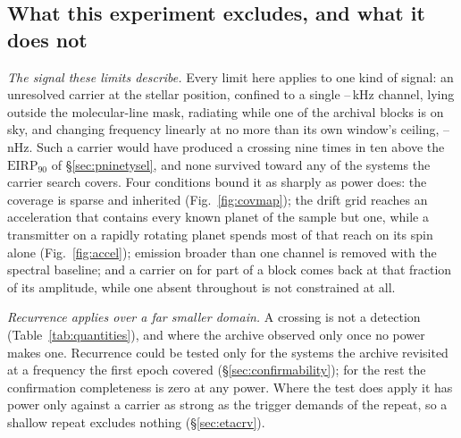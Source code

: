 \subsection{What this experiment excludes, and what it does not}
\label{sec:excludes}

\noindent\emph{The signal these limits describe.} Every limit here applies to
one kind of signal: an unresolved carrier at the stellar position, confined to
a single \ChanLoA--\ChanHiA\,kHz channel, lying outside the molecular-line
mask, radiating while one of the archival blocks is on sky, and changing
frequency linearly at no more than its own window's ceiling,
\DriftCeilLo--\DriftCeilHi\,nHz. Such a carrier would
have produced a crossing nine times in ten above the $\mathrm{EIRP}_{90}$ of
\S\ref{sec:pninetysel}, and none survived toward any of the \NSysClassA{}
systems the carrier search covers. Four conditions
bound it as sharply as power does: the coverage is sparse and
inherited (Fig.~\ref{fig:covmap}); the drift grid reaches an acceleration that contains every
known planet of the sample but one, while a transmitter on a rapidly rotating
planet spends most of that reach on its spin alone (Fig.~\ref{fig:accel}); emission broader than one channel is
removed with the spectral baseline; and a carrier on for part of a block comes
back at that fraction of its amplitude, while one absent throughout is not
constrained at all.

\noindent\emph{Recurrence applies over a far smaller domain.} A
crossing is not a detection (Table~\ref{tab:quantities}), and where the archive
observed only once no power makes one. Recurrence could be tested only for the
systems the archive revisited at a frequency the first epoch covered
(\S\ref{sec:confirmability}); for the rest the confirmation completeness is
zero at any power. Where the test does apply it has power
only against a carrier as strong as the trigger demands of the repeat, so a
shallow repeat excludes nothing (\S\ref{sec:etacrv}).

